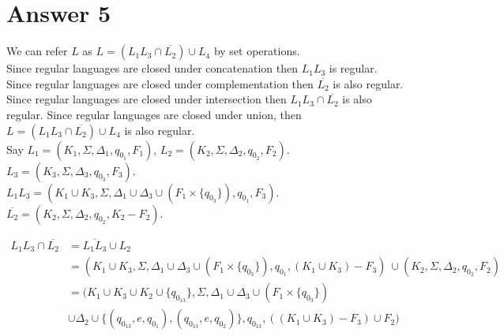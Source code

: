\documentclass[12pt]{article}
\begin{document}
\begin{center}
\end{center}


\section*{Answer 5}

We can refer $L$ as $L=(L_1L_3\cap \overline{L_2})\cup L_4$ by set operations.\\

Since regular languages are closed under concatenation then $L_1L_3$ is regular. Since regular languages are closed under complementation then $\overline{L_2}$ is also regular. Since regular languages are closed under intersection then $L_1L_3\cap \overline{L_2}$ is also regular. Since regular languages are closed under union, then $L=(L_1L_3\cap \overline{L_2})\cup L_4$ is also regular.\\

Say $L_1=(K_1, \Sigma, \Delta_1, q_{0_1}, F_1)$, $L_2=(K_2, \Sigma, \Delta_2, q_{0_2}, F_2)$. $L_3=(K_3, \Sigma, \Delta_3, q_{0_3}, F_3)$.\\ $L_1L_3=(K_1\cup K_3, \Sigma, \Delta_1 \cup \Delta_3 \cup (F_1 \times \{q_{0_3}\}), q_{0_1}, F_3)$. $\overline{L_2}=(K_2, \Sigma, \Delta_2, q_{0_2}, K_2-F_2)$.

\begin{align*}
L_1L_3\cap \overline{L_2} &= \overline{L_1L_3} \cup L_2 \\
						  &= (K_1\cup K_3, \Sigma, \Delta_1 \cup \Delta_3 \cup (F_1 \times \{q_{0_3}\}), q_{0_1}, (K_1\cup K_3) - F_3)\ \cup (K_2, \Sigma, \Delta_2, q_{0_2}, F_2) \\
						  &= (K_1\cup K_3\cup K_2 \cup \{q_{0_{13}}\}, \Sigma, \Delta_1 \cup \Delta_3 \cup (F_1 \times \{q_{0_3}\}) \\
						  & \cup \Delta_2 \cup \{(q_{0_{13}},e,q_{0_1}), (q_{0_{13}},e,q_{0_2})\}, q_{0_{13}}, ((K_1\cup K_3) - F_3)\cup F_2)
 \end{align*}
\end{document}
